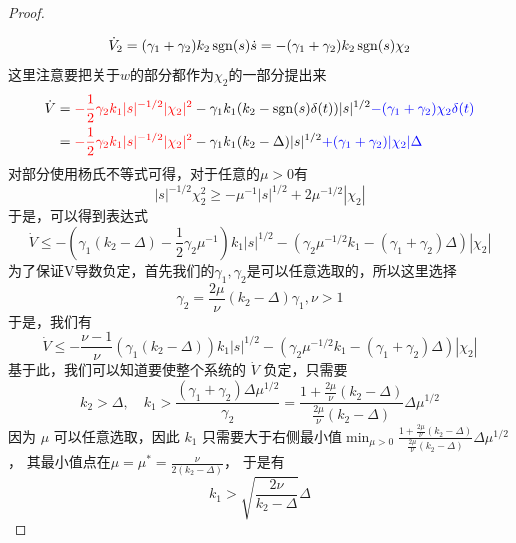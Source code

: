 \begin{proof}
\begin{align*}
	\end{align*}
	\begin{align*}
		\dot{V}_2=(\gamma_1+\gamma_2)k_2  \operatorname{sgn}(s)\dot{s}
		=-(\gamma_1+\gamma_2)k_2  \operatorname{sgn}(s)\chi_2
	\end{align*}
	这里注意要把关于$w$的部分都作为$\chi_2$的一部分提出来
	\begin{align*}
		\dot{V}
		&=\textcolor{red}{-\frac12 \gamma_2 k_1 |s|^{-1/2} |\chi_2|^2}
		-\gamma_1 k_1 (k_2-\operatorname{sgn}(s) \delta(t))|s|^{1/2}
		\textcolor{blue}{-(\gamma_1+\gamma_2)\chi_2 \delta(t)}
		\\
		&=\textcolor{red}{-\frac12 \gamma_2 k_1 |s|^{-1/2} |\chi_2|^2}
		-\gamma_1 k_1 (k_2-\Delta)|s|^{1/2}
		\textcolor{blue}{+(\gamma_1+\gamma_2)|\chi_2| \Delta}
	\end{align*}
	对部分使用杨氏不等式可得，对于任意的$\mu>0$有
	\begin{equation}
		|s|^{-1/2}\chi_2^2\geq 
		-\mu^{-1}|s|^{1/2}
		+2{\mu^{-1/2}}|\chi_2|
	\end{equation}
	于是，可以得到表达式
	\begin{equation}
		\dot{V}\leq 
		-\left(
			\gamma_1 (k_2-\Delta)-\frac12 \gamma_2 \mu^{-1}
		\right)
		k_1 |s|^{1/2}
		-\left( \gamma_2 \mu^{-1/2}k_1-(\gamma_1+\gamma_2)\Delta\right)
		|\chi_2|
	\end{equation}
	为了保证V导数负定，首先我们的$\gamma_1,\gamma_2$是可以任意选取的，所以这里选择
	\begin{equation*}
		\gamma_2=\frac{2\mu}{\nu }(k_2 -\Delta) \gamma_1,\nu>1
	\end{equation*}
	于是，我们有
	\begin{equation}
		\dot{V}\leq 
		-\frac{\nu-1}{\nu}\left(\gamma_1 (k_2-\Delta)\right)
		k_1 |s|^{1/2}
		-\left( \gamma_2 \mu^{-1/2}k_1-(\gamma_1+\gamma_2)\Delta\right)
		|\chi_2|
	\end{equation}
	基于此，我们可以知道要使整个系统的 $\dot V$ 负定，只需要
	\begin{equation}
		k_2>\Delta,\quad 
		k_1>\frac{(\gamma_1+\gamma_2)\Delta\mu^{1/2}}{\gamma_2}
		=\frac{1+\frac{2\mu}{\nu }(k_2 -\Delta) }{\frac{2\mu}{\nu }(k_2 -\Delta) }\Delta \mu^{1/2}
	\end{equation}
	因为 $\mu$ 可以任意选取，因此 $k_1$ 只需要大于右侧最小值$\min_{\mu>0} \frac{1+\frac{2\mu}{\nu }(k_2 -\Delta) }{\frac{2\mu}{\nu }(k_2 -\Delta) }\Delta \mu^{1/2}$，
	其最小值点在$\mu=\mu^*=\frac{\nu}{2(k_2-\Delta)}$，
	于是有
	\begin{equation}
		k_1> \sqrt{\frac{2\nu}{k_2 -\Delta}}\Delta
	\end{equation}
\end{proof}

